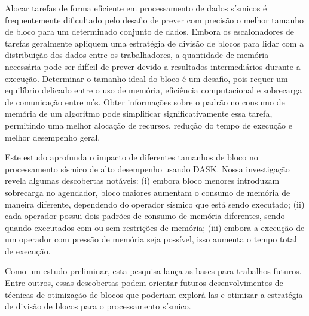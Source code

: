 \begin{resumo} 
    Alocar tarefas de forma eficiente em processamento de dados sísmicos é frequentemente dificultado pelo desafio de prever com precisão o melhor tamanho de bloco para um determinado conjunto de dados.
    Embora os escalonadores de tarefas geralmente apliquem uma estratégia de divisão de blocos para lidar com a distribuição dos dados entre os trabalhadores, a quantidade de memória necessária pode ser difícil de prever devido a resultados intermediários durante a execução.
    Determinar o tamanho ideal do bloco é um desafio, pois requer um equilíbrio delicado entre o uso de memória, eficiência computacional e sobrecarga de comunicação entre nós.
    Obter informações sobre o padrão no consumo de memória de um algoritmo pode simplificar significativamente essa tarefa, permitindo uma melhor alocação de recursos, redução do tempo de execução e melhor desempenho geral.

    Este estudo aprofunda o impacto de diferentes tamanhos de bloco no processamento sísmico de alto desempenho usando DASK.
    Nossa investigação revela algumas descobertas notáveis:
    (i) embora bloco menores introduzam sobrecarga no agendador, bloco maiores aumentam o consumo de memória de maneira diferente, dependendo do operador sísmico que está sendo executado;
    (ii) cada operador possui dois padrões de consumo de memória diferentes, sendo quando executados com ou sem restrições de memória;
    (iii) embora a execução de um operador com pressão de memória seja possível, isso aumenta o tempo total de execução.

    Como um estudo preliminar, esta pesquisa lança as bases para trabalhos futuros.
    Entre outros, essas descobertas podem orientar futuros desenvolvimentos de técnicas de otimização de blocos que poderiam explorá-las e otimizar a estratégia de divisão de blocos para o processamento sísmico.
\end{resumo}
